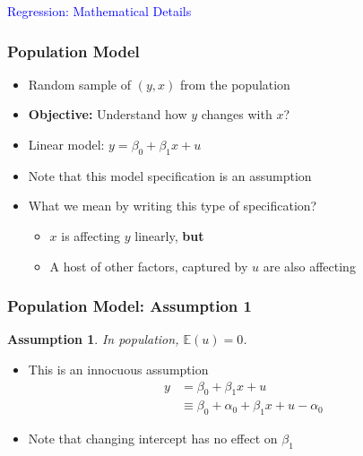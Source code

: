 \documentclass{beamer}
\newtheorem{assumption}{Assumption}[section]
\theoremstyle{plain}
\begin{document}
\begin{frame}
	\begin{center}
		\Large\textcolor{blue}{Regression: Mathematical Details}
	\end{center}
\end{frame}

	

\begin{frame}
	\frametitle{Population Model}
	\begin{itemize}
		\item Random sample of $(y,x)$ from the population
		\item \textbf{Objective:} Understand how $y$ changes with $x$?
		\item Linear model: $y = \beta_0 + \beta_1 x + u$
		\item Note that this model specification is an assumption
		\item What we mean by writing this type of specification?
		\begin{itemize}
			\item $x$ is affecting $y$ linearly, \textbf{but} 
			\item A host of other factors, captured by $u$ are also affecting
		\end{itemize}
	\end{itemize}
\end{frame}	


\begin{frame}
	\frametitle{Population Model: Assumption 1}
	\begin{assumption}\label{assu:ols-1}
		In population, $\mathbb E(u) = 0$.
	\end{assumption}
	
	\begin{itemize}
		\item This is an innocuous assumption
		\begin{align*}
			y &= \beta_0 + \beta_1 x + u \\
			&\equiv \beta_0 + \alpha_0 + \beta_1 x + u -\alpha_0 
		\end{align*}
		\item Note that changing intercept has no effect on $\beta_1$
	\end{itemize}
\end{frame}	
\end{document}
